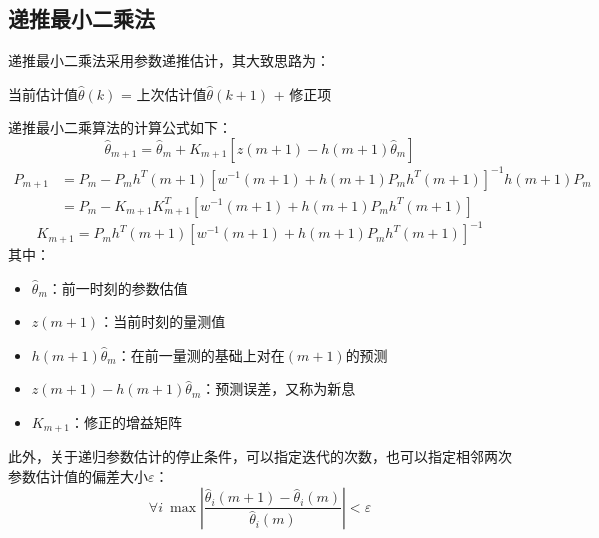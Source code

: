 \documentclass[UTF8]{article}
\begin{document}
\subsection{递推最小二乘法}
递推最小二乘法采用参数递推估计，其大致思路为：
\begin{center}
    当前估计值$\hat{\theta}(k)$ = 上次估计值$\hat{\theta}(k+1)$ + 修正项
\end{center}
递推最小二乘算法的计算公式如下：
\begin{equation*}
    \hat{\theta}_{m+1} = \hat{\theta}_{m} + K_{m+1}[z(m+1) - h(m+1)\hat{\theta}_m]
\end{equation*}
\begin{align*}
    P_{m+1} &= P_m - P_m h^T(m+1) [w^{-1}(m+1) + h(m+1) P_m h^T(m+1)]^{-1} h(m+1) P_m \\
    &= P_m - K_{m+1} K_{m+1}^T[w^{-1}(m+1) + h(m+1) P_m h^T(m+1)]
\end{align*}
\begin{equation*}
    K_{m+1} = P_m h^T(m+1) [w^{-1}(m+1) + h(m+1) P_m h^T(m+1)]^{-1}
\end{equation*}
其中：
\begin{itemize}
    \item $\hat{\theta}_m$：前一时刻的参数估值
    \item $z(m+1)$：当前时刻的量测值
    \item $h(m+1) \hat{\theta}_m$：在前一量测的基础上对在$(m+1)$的预测
    \item $z(m+1) - h(m+1) \hat{\theta}_m$：预测误差，又称为新息
    \item $K_{m+1}$：修正的增益矩阵
\end{itemize}

此外，关于递归参数估计的停止条件，可以指定迭代的次数，也可以指定相邻两次参数估计值的偏差大小$\varepsilon$：
\begin{equation*}
    \forall{i} \ \max | \frac{\hat{\theta}_i(m+1) - \hat{\theta}_i(m)}{\hat{\theta}_i(m)} | < \varepsilon
\end{equation*}

\end{document}
